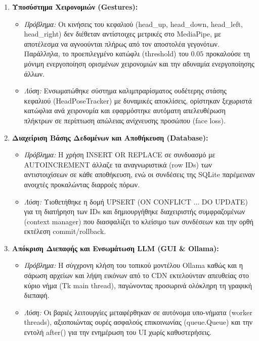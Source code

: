 \documentclass[twoside, a4paper, 11pt]{article}
\newcommand{\textlatin}[1]{\textenglish{#1}}
\begin{document}
\begin{enumerate}
    \item \textbf{Υποσύστημα Χειρονομιών (\textlatin{Gestures}):}
    \begin{itemize}
        \item \emph{Πρόβλημα:} Οι κινήσεις του κεφαλιού (\textlatin{head\_up, head\_down, head\_left, head\_right}) δεν διέθεταν αντίστοιχες μετρικές στο \textlatin{MediaPipe}, με αποτέλεσμα να αγνοούνται πλήρως από τον αποστολέα γεγονότων. Παράλληλα, το προεπιλεγμένο κατώφλι (\textlatin{threshold}) του $0.05$ προκαλούσε τη μόνιμη ενεργοποίηση ορισμένων χειρονομιών και την αδυναμία ενεργοποίησης άλλων.
        \item \emph{Λύση:} Ενσωματώθηκε σύστημα καλιμπραρίσματος ουδέτερης στάσης κεφαλιού (\textlatin{HeadPoseTracker}) με δυναμικές αποκλίσεις, ορίστηκαν ξεχωριστά κατώφλια ανά χειρονομία και εφαρμόστηκε αυτόματη απελευθέρωση πλήκτρων σε περίπτωση απώλειας ανίχνευσης προσώπου (\textlatin{face loss}).
    \end{itemize}

    \item \textbf{Διαχείριση Βάσης Δεδομένων και Αποθήκευση (\textlatin{Database}):}
    \begin{itemize}
        \item \emph{Πρόβλημα:} Η χρήση \textlatin{INSERT OR REPLACE} σε συνδυασμό με \textlatin{AUTOINCREMENT} άλλαζε τα αναγνωριστικά (\textlatin{row IDs}) των αντιστοιχίσεων σε κάθε αποθήκευση, ενώ οι συνδέσεις της \textlatin{SQLite} παρέμειναν ανοιχτές προκαλώντας διαρροές πόρων.
        \item \emph{Λύση:} Υιοθετήθηκε η δομή \textlatin{UPSERT} (\textlatin{ON CONFLICT ... DO UPDATE}) για τη διατήρηση των \textlatin{IDs} και δημιουργήθηκε διαχειριστής συμφραζομένων (\textlatin{context manager}) που διασφαλίζει το κλείσιμο των συνδέσεων και την ορθή εκτέλεση \textlatin{commit/rollback}.
    \end{itemize}

    \item \textbf{Απόκριση Διεπαφής και Ενσωμάτωση LLM (\textlatin{GUI \& Ollama}):}
    \begin{itemize}
        \item \emph{Πρόβλημα:} Η σύγχρονη κλήση του τοπικού μοντέλου \textlatin{Ollama} καθώς και η σάρωση αρχείων και λήψη εικόνων από το \textlatin{CDN} εκτελούνταν απευθείας στο κύριο νήμα (\textlatin{Tk main thread}), παγώνοντας προσωρινά ολόκληρη τη γραφική διεπαφή.
        \item \emph{Λύση:} Οι βαριές λειτουργίες μεταφέρθηκαν σε αυτόνομα υπο-νήματα (\textlatin{worker threads}), αξιοποιώντας ουρές ασφαλούς επικοινωνίας (\textlatin{queue.Queue}) και την εντολή \textlatin{after()} για την ενημέρωση του UI χωρίς καθυστερήσεις.
    \end{itemize}


\end{enumerate}
\end{document}
